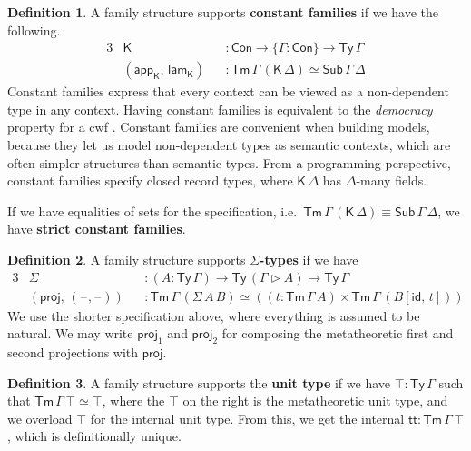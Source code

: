 \documentclass[12pt,a4paper,twoside,openany]{book}
\theoremstyle{remark}
\theoremstyle{definition}
\newtheorem{mydefinition}{Definition}
\theoremstyle{theorem}
\newcommand{\id}{\mathsf{id}}
\newcommand{\Con}{\mathsf{Con}}
\newcommand{\Sub}{\mathsf{Sub}}
\newcommand{\Tm}{\mathsf{Tm}}
\newcommand{\Ty}{\mathsf{Ty}}
\newcommand{\proj}{\mathsf{proj}}
\renewcommand{\tt}{\mathsf{tt}}
\newcommand{\blank}{\mathord{\hspace{1pt}\text{--}\hspace{1pt}}}
\newcommand{\ext}{\triangleright}
\newcommand{\lamK}{\mathsf{lam}_{\K}}
\newcommand{\appK}{\mathsf{app}_{\K}}
\newcommand{\K}{\mathsf{K}}
\begin{document}
\begin{mydefinition}
\label{def:constant-families}
A family structure supports \textbf{constant families} if we have the following.
\begin{alignat*}{3}
  & \K &&: \Con \to \{\Gamma : \Con \} \to \Ty\,\Gamma \\
  & (\appK,\,\lamK) &&: \Tm\,\Gamma\,(\K\,\Delta) \simeq \Sub\,\Gamma\,\Delta
\end{alignat*}
Constant families express that every context can be viewed as a non-dependent
type in any context. Having constant families is equivalent to the
\emph{democracy} property for a cwf
\cite{clairambault2014biequivalence,forsberg-phd}.  Constant families are
convenient when building models, because they let us model non-dependent types
as semantic contexts, which are often simpler structures than semantic types.
From a programming perspective, constant families specify closed record types,
where $\K\,\Delta$ has $\Delta$-many fields.

If we have equalities of sets for the specification,
i.e.\ $\Tm\,\Gamma\,(\K\,\Delta) \equiv \Sub\,\Gamma\,\Delta$, we have \textbf{strict
  constant families}.

\end{mydefinition}

\begin{mydefinition}
A family structure supports \textbf{$\Sigma$-types} if we have
\begin{alignat*}{3}
  & \Sigma  &&: (A : \Ty\,\Gamma) \to \Ty\,(\Gamma\ext A) \to \Ty\,\Gamma\\
  & (\proj,\,(\blank,\blank)) &&: \Tm\,\Gamma\,(\Sigma\,A\,B) \simeq ((t : \Tm\,\Gamma\,A) \times \Tm\,\Gamma\,(B[\id,\,t]))
\end{alignat*}
We use the shorter specification above, where everything is assumed to be
natural. We may write $\proj_1$ and $\proj_2$ for composing the metatheoretic
first and second projections with $\proj$.
\end{mydefinition}

\begin{mydefinition}
A family structure supports the \textbf{unit type} if we have $\top : \Ty\,\Gamma$ such
that $\Tm\,\Gamma\,\top \simeq \top$, where the $\top$ on the right is the
metatheoretic unit type, and we overload $\top$ for the internal unit type.
From this, we get the internal $\tt : \Tm\,\Gamma\,\top$, which is
definitionally unique.
\end{mydefinition}
\end{document}
